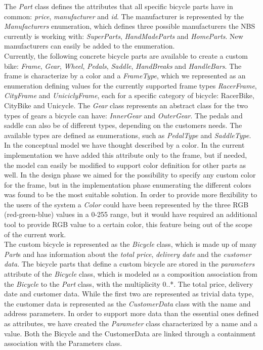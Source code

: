\noindent The \emph{Part} class defines the attributes that all specific bicycle
parts have in common: \emph{price}, \emph{manufacturer} and \emph{id}. The
manufacturer is represented by the \emph{Manufacturers} enumeration, which
defines three possible manufacturers the NBS currently is working with:
\emph{SuperParts}, \emph{HandMadeParts} and \emph{HomeParts}. New manufacturers
can easily be added to the enumeration.\\

\noindent Currently, the following concrete bicycle parts are available to
create a custom bike: \emph{Frame}, \emph{Gear}, \emph{Wheel}, \emph{Pedals}, \emph{Saddle},
\emph{HandBreaks} and \emph{HandleBars}. The frame is characterize by
a color and a \emph{FrameType}, which we represented as an enumeration defining
values for the currently supported frame types \emph{RacerFrame}, \emph{CityFrame} and
\emph{UniciclyFrame}, each for a specific category of bicycle: RacerBike,
CityBike and Unicycle. The \emph{Gear} class represents an abstract class for
the two types of gears a bicycle can have: \emph{InnerGear} and
\emph{OuterGear}. The pedals and saddle can also be of different types,
depending on the customers needs. The available types are defined as
enumerations, such as \emph{PedalType} and \emph{SaddleType}. \\

\noindent In the conceptual model we have thought described by a color. In the
current implementation we have added this attribute only to the frame, but if
needed, the model can easily be modified to support color definition for other parts as well.
In the design phase we aimed for the possibility to specify any custom color for
the frame, but in the implementation phase enumerating the different colors was
found to be the most suitable solution. In order to provide more flexibility to
the users of the system a \emph{Color} could have been represented by the three
RGB (red-green-blue) values in a 0-255 range, but it would have required an
additional tool to provide RGB value to a certain color, this feature being out
of the scope of the current work.\\

\noindent The custom bicycle is represented as the \emph{Bicycle} class, which
is made up of many \emph{Part}s and has information about the \emph{total price},
\emph{delivery date} and the \emph{customer data}. The bicycle parts that define
a custom bicycle are stored in the \emph{parameters} attribute of the
\emph{Bicycle} class, which is modeled as a composition association from the
\emph{Bicycle} to the \emph{Part} class, with the multiplicity 0..*. The total
price, delivery date and customer data. While the first two are represented as
trivial data type, the customer data is represented as the \emph{CustomerData}
class with the name and address parameters. In order to support more data than
the essential ones defined as attributes, we have created the \emph{Parameter}
class characterized by a name and a value. Both the Bicycle and the CustomerData
are linked through a containment association with the Parameters class.\\

